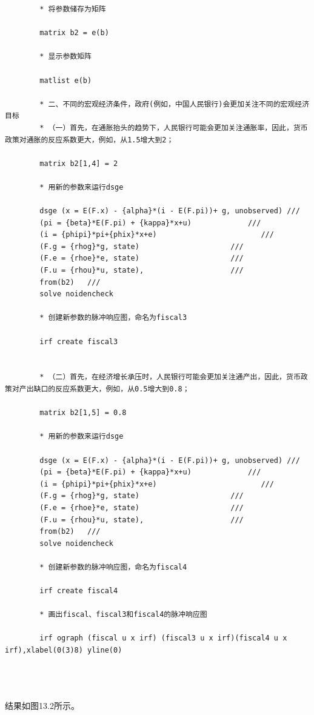 \documentclass[cn,12pt,math=newtx,citestyle=gb7714-2015,bibstyle=gb7714-2015]{elegantbook}
\begin{document}
	\begin{lstlisting}
		* 将参数储存为矩阵
		
		matrix b2 = e(b)
		
		* 显示参数矩阵
		
		matlist e(b)
		
		* 二、不同的宏观经济条件，政府(例如，中国人民银行)会更加关注不同的宏观经济目标
		* （一）首先，在通胀抬头的趋势下，人民银行可能会更加关注通胀率，因此，货币政策对通胀的反应系数更大，例如，从1.5增大到2；
		
		matrix b2[1,4] = 2
		
		* 用新的参数来运行dsge
		
		dsge (x = E(F.x) - {alpha}*(i - E(F.pi))+ g, unobserved) ///
		(pi = {beta}*E(F.pi) + {kappa}*x+u)             ///
		(i = {phipi}*pi+{phix}*x+e)                        ///
		(F.g = {rhog}*g, state)                     ///
		(F.e = {rhoe}*e, state)                     ///
		(F.u = {rhou}*u, state),                    ///
		from(b2)   /// 
		solve noidencheck
		
		* 创建新参数的脉冲响应图，命名为fiscal3
		
		irf create fiscal3
		
		
		* （二）首先，在经济增长承压时，人民银行可能会更加关注通产出，因此，货币政策对产出缺口的反应系数更大，例如，从0.5增大到0.8；
		
		matrix b2[1,5] = 0.8
		
		* 用新的参数来运行dsge
		
		dsge (x = E(F.x) - {alpha}*(i - E(F.pi))+ g, unobserved) ///
		(pi = {beta}*E(F.pi) + {kappa}*x+u)             ///
		(i = {phipi}*pi+{phix}*x+e)                        ///
		(F.g = {rhog}*g, state)                     ///
		(F.e = {rhoe}*e, state)                     ///
		(F.u = {rhou}*u, state),                    ///
		from(b2)   /// 
		solve noidencheck
		
		* 创建新参数的脉冲响应图，命名为fiscal4
		
		irf create fiscal4
		
		* 画出fiscal、fiscal3和fiscal4的脉冲响应图
		
		irf ograph (fiscal u x irf) (fiscal3 u x irf)(fiscal4 u x irf),xlabel(0(3)8) yline(0)
		
		
		
	\end{lstlisting}

    结果如图13.2所示。
\end{document}

